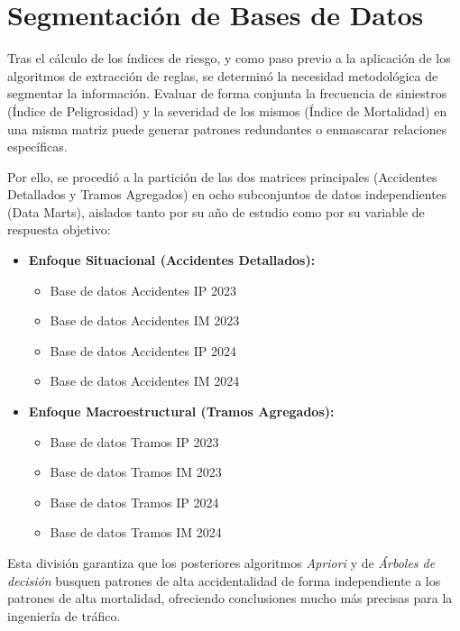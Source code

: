 \documentclass[twoside,a4paper,12pt,onecolumn,openany]{book}
\begin{document}
\section{Segmentación de Bases de Datos}
Tras el cálculo de los índices de riesgo, y como paso previo a la aplicación de los algoritmos de extracción de reglas, se determinó la necesidad metodológica de segmentar la información. Evaluar de forma conjunta la frecuencia de siniestros (Índice de Peligrosidad) y la severidad de los mismos (Índice de Mortalidad) en una misma matriz puede generar patrones redundantes o enmascarar relaciones específicas.

\vspace{0,5cm}

Por ello, se procedió a la partición de las dos matrices principales (Accidentes Detallados y Tramos Agregados) en ocho subconjuntos de datos independientes (Data Marts), aislados tanto por su año de estudio como por su variable de respuesta objetivo:

\begin{itemize}
    \item \textbf{Enfoque Situacional (Accidentes Detallados):} 
    \begin{itemize}
        \item Base de datos Accidentes IP 2023
        \item Base de datos Accidentes IM 2023
        \item Base de datos Accidentes IP 2024
        \item Base de datos Accidentes IM 2024
    \end{itemize}
    \item \textbf{Enfoque Macroestructural (Tramos Agregados):}
    \begin{itemize}
        \item Base de datos Tramos IP 2023
        \item Base de datos Tramos IM 2023
        \item Base de datos Tramos IP 2024
        \item Base de datos Tramos IM 2024
    \end{itemize}
\end{itemize}

Esta división garantiza que los posteriores algoritmos \textit{Apriori} y de \textit{Árboles de decisión} busquen patrones de alta accidentalidad de forma independiente a los patrones de alta mortalidad, ofreciendo conclusiones mucho más precisas para la ingeniería de tráfico.
\end{document}
